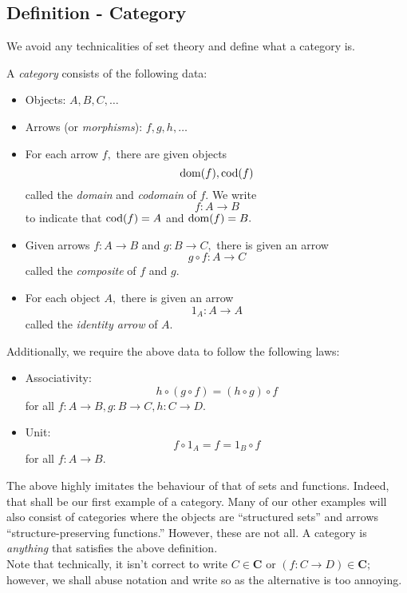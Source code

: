 \subsection{Definition - Category}
We avoid any technicalities of set theory and define what a category is.
\begin{defn} 
	A \emph{category} consists of the following data:
	\begin{itemize}
		\item Objects: $A, B, C, \ldots$
		\item Arrows (or \emph{morphisms}): $f, g, h, \ldots$
		\item For each arrow $f,$ there are given objects
		\[\operatorname{dom}(f), \operatorname{cod}(f)\]
		called the \emph{domain} and \emph{codomain} of $f.$ We write 
		\[f:A \to B\]
		to indicate that $\operatorname{cod}(f) = A$ and $\operatorname{dom}(f) = B.$
		\item Given arrows $f:A\to B$ and $g:B\to C,$ there is given an arrow
		\[g\circ f : A \to C\]
		called the \emph{composite} of $f$ and $g.$
		\item For each object $A,$ there is given an arrow
		\[1_A : A \to A\]
		called the \emph{identity arrow} of $A.$
	\end{itemize}
	Additionally, we require the above data to follow the following laws:
	\begin{itemize}
		\item Associativity:
		\[h \circ (g \circ f) = (h \circ g) \circ f\]
		for all $f : A \to B, g: B \to C, h : C \to D.$
		\item Unit:
		\[f\circ 1_A = f = 1_B \circ f\]
		for all $f:A\to B.$
	\end{itemize}
\end{defn}
The above highly imitates the behaviour of that of sets and functions. Indeed, that shall be our first example of a category. Many of our other examples will also consist of categories where the objects are ``structured sets'' and arrows ``structure-preserving functions.'' However, these are not all. A category is \emph{anything} that satisfies the above definition.\\
Note that technically, it isn't correct to write $C \in \mathbf{C}$ or $(f:C \to D) \in \mathbf{C};$ however, we shall abuse notation and write so as the alternative is too annoying.
